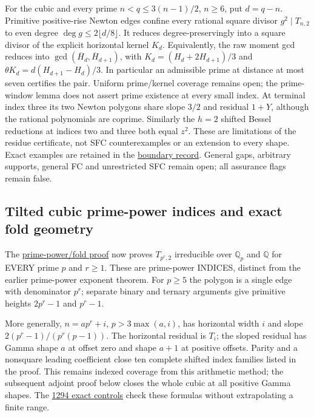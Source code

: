 \documentclass[11pt]{article}
\begin{document}
For the cubic and every prime $n<q\le3(n-1)/2$, $n\ge6$, put $d=q-n$.
Primitive positive-rise Newton edges confine every rational square divisor
$g^2\mid T_{n,2}$ to even degree $\deg g\le2\lfloor d/8\rfloor$.
It reduces degree-preservingly into a square divisor of the explicit
horizontal kernel $K_d$. Equivalently, the raw moment gcd reduces into
$\gcd(\overline H_d,\overline H_{d+1})$, with
$K_d=(H_d+2H_{d+1})/3$ and
$\theta K_d=d(H_{d+1}-H_d)/3$.
In particular an admissible prime at distance at most seven certifies
the pair. Uniform prime/kernel coverage remains open; the prime-window
lemma does not assert prime existence at every small index.
 At terminal index three its two Newton polygons share slope $3/2$
and residual $1+Y$, although the rational polynomials are coprime.
Similarly the $h=2$ shifted Bessel reductions at indices two and three
both equal $z^2$. These are limitations of the residue certificate,
not SFC counterexamples or an extension to every shape. Exact examples
are retained in the \href{dyadic_binomial_frontier_diagnostics.json}{boundary record}.
General gaps, arbitrary supports, general FC and unrestricted SFC remain
open; all assurance flags remain false.

\subsection*{Tilted cubic prime-power indices and exact fold geometry}
The \href{TILTED_CUBIC_PRIME_POWER_AND_FOLD.tex}{prime-power/fold proof}
now proves $T_{p^r,2}$ irreducible over $\mathbb Q_p$ and $\mathbb Q$
for EVERY prime $p$ and $r\ge1$. These are prime-power INDICES, distinct
from the earlier prime-power exponent theorem. For $p\ge5$ the polygon
is a single edge with denominator $p^r$; separate binary and ternary
arguments give primitive heights $2p^r-1$ and $p^r-1$.

More generally, $n=ap^r+i$, $p>3\max(a,i)$, has horizontal width $i$
and slope $2(p^r-1)/(p^r(p-1))$. The horizontal residual is $T_i$;
the sloped residual has Gamma shape $a$ at offset zero and shape $a+1$
at positive offsets. Parity and a nonsquare leading coefficient close
ten complete shifted index families listed in the proof. This remains
indexed coverage from this arithmetic method; the subsequent adjoint proof
below closes the whole cubic at all positive Gamma shapes.
The \href{tilted_cubic_frontier_verification.json}{1294 exact controls}
check these formulas without extrapolating a finite range.
\end{document}
